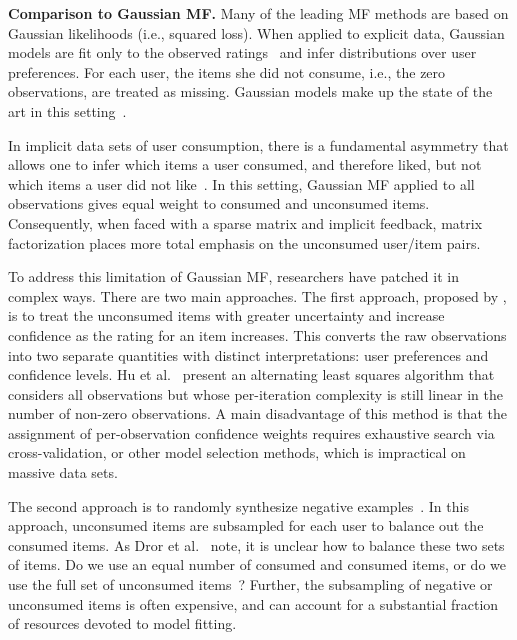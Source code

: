 {\bf Comparison to Gaussian MF.} Many of the leading MF methods are
based on Gaussian likelihoods (i.e., squared loss). When applied to
explicit data, Gaussian models are fit only to the observed
ratings~\cite{Koren:2009} and infer distributions over user
preferences. For each user, the items she did not consume, i.e., the
zero observations, are treated as missing. Gaussian models make up the
state of the art in this setting~\cite{Salakhutdinov:2008,
  Salakhutdinov:2008a,Koren:2009}.

In implicit data sets of user consumption, there is a fundamental
asymmetry that allows one to infer which items a user consumed, and
therefore liked, but not which items a user did not
like~\cite{Hu:2008p9402}. In this setting, Gaussian MF applied to all
observations gives equal weight to consumed and unconsumed items.
Consequently, when faced with a sparse matrix and implicit feedback,
matrix factorization places more total emphasis on the unconsumed
user/item pairs.

To address this limitation of Gaussian MF, researchers have patched it
in complex ways. There are two main approaches. The first approach,
proposed by \cite{Hu:2008p9402}, is to treat the unconsumed items with
greater uncertainty and increase confidence as the rating for an item
increases. This converts the raw observations into two separate
quantities with distinct interpretations: user preferences and
confidence levels. Hu et al.~\cite{Hu:2008p9402} present an
alternating least squares algorithm that considers all observations
but whose per-iteration complexity is still linear in the number of
non-zero observations. A main disadvantage of this method is that the
assignment of per-observation confidence weights requires exhaustive
search via cross-validation, or other model selection methods, which
is impractical on massive data sets.

The second approach is to randomly synthesize negative
examples~\cite{Dror:2012a, Gantner:2012p9364, Paquet:2013p9197}. In
this approach, unconsumed items are subsampled for each user to
balance out the consumed items. As Dror et al.~\cite{Dror:2012a} note,
it is unclear how to balance these two sets of items. Do we use an
equal number of consumed and consumed items, or do we use the full set
of unconsumed items~\cite{Cremonesi:2010, Hu:2008p9402}?  Further, the
subsampling of negative or unconsumed items is often expensive, and
can account for a substantial fraction of resources devoted to model
fitting.

